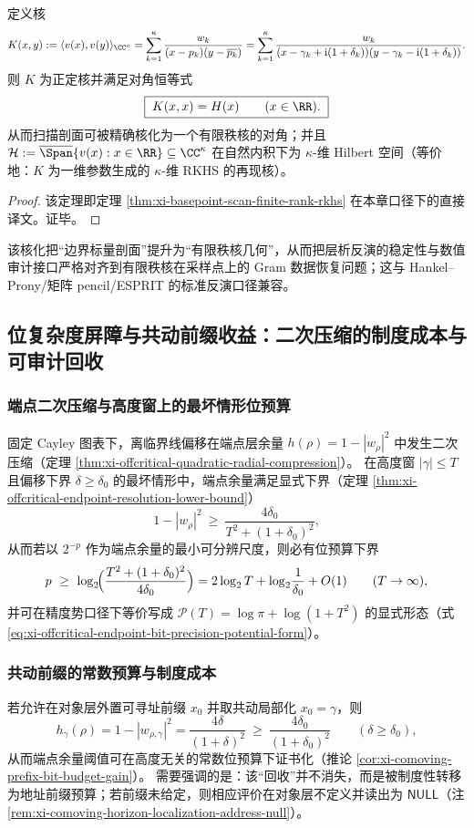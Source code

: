 \begin{theorem}\label{thm:cdim-basepoint-scan-finite-rank-rkhs}
定义核
\[
K(x,y):=\langle v(x),v(y)\rangle_{\CC^\kappa}
=\sum_{k=1}^{\kappa}\frac{w_k}{(x-p_k)(y-\overline{p_k})}
=\sum_{k=1}^{\kappa}\frac{w_k}{(x-\gamma_k+\mathrm{i}(1+\delta_k))(y-\gamma_k-\mathrm{i}(1+\delta_k))}.
\]
则 \(K\) 为正定核并满足对角恒等式
\[
\boxed{\;K(x,x)=H(x)\qquad(x\in\RR).\;}
\]
从而扫描剖面可被精确核化为一个有限秩核的对角；并且
\(\mathcal{H}:=\overline{\Span}\{v(x):x\in\RR\}\subseteq\CC^\kappa\)
在自然内积下为 \(\kappa\)-维 Hilbert 空间（等价地：\(K\) 为一维参数生成的 \(\kappa\)-维 RKHS 的再现核）。
\end{theorem}
\begin{proof}
该定理即定理 \ref{thm:xi-basepoint-scan-finite-rank-rkhs} 在本章口径下的直接译文。证毕。
\end{proof}
该核化把“边界标量剖面”提升为“有限秩核几何”，从而把层析反演的稳定性与数值审计接口严格对齐到有限秩核在采样点上的 Gram 数据恢复问题；这与 Hankel--Prony/矩阵 pencil/ESPRIT 的标准反演口径兼容。

\subsection{位复杂度屏障与共动前缀收益：二次压缩的制度成本与可审计回收}\label{subsec:cdim-bit-budget-barrier-comoving-prefix-gain}
\subsubsection{端点二次压缩与高度窗上的最坏情形位预算}
固定 Cayley 图表下，离临界线偏移在端点层余量 \(h(\rho)=1-|w_\rho|^2\) 中发生二次压缩（定理 \ref{thm:xi-offcritical-quadratic-radial-compression}）。
在高度窗 \(|\gamma|\le T\) 且偏移下界 \(\delta\ge\delta_0\) 的最坏情形中，端点余量满足显式下界（定理 \ref{thm:xi-offcritical-endpoint-resolution-lower-bound}）
\[
1-|w_\rho|^2\ \ge\ \frac{4\delta_0}{T^2+(1+\delta_0)^2},
\]
从而若以 \(2^{-p}\) 作为端点余量的最小可分辨尺度，则必有位预算下界
\[
p\ \ge\ \log_2\!\Bigl(\frac{T^2+(1+\delta_0)^2}{4\delta_0}\Bigr)
=2\log_2T+\log_2\!\frac{1}{\delta_0}+O(1)\qquad(T\to\infty),
\]
并可在精度势口径下等价写成 \(\mathcal{P}(T)=\log\pi+\log(1+T^2)\) 的显式形态（式 \eqref{eq:xi-offcritical-endpoint-bit-precision-potential-form}）。

\subsubsection{共动前缀的常数预算与制度成本}
若允许在对象层外置可寻址前缀 \(x_0\) 并取共动局部化 \(x_0=\gamma\)，则
\[
h_{\gamma}(\rho)=1-|w_{\rho,\gamma}|^2=\frac{4\delta}{(1+\delta)^2}\ \ge\ \frac{4\delta_0}{(1+\delta_0)^2}\qquad(\delta\ge\delta_0),
\]
从而端点余量阈值可在高度无关的常数位预算下证书化（推论 \ref{cor:xi-comoving-prefix-bit-budget-gain}）。
需要强调的是：该“回收”并不消失，而是被制度性转移为地址前缀预算；若前缀未给定，则相应评价在对象层不定义并读出为 \(\mathsf{NULL}\)（注 \ref{rem:xi-comoving-horizon-localization-address-null}）。

